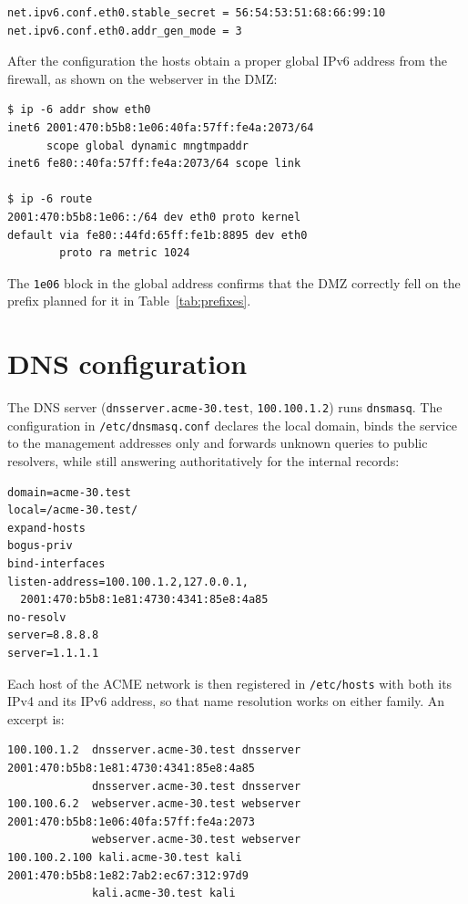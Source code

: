 \documentclass[twocolumn]{NobArticle}
\begin{document}
\begin{lstlisting}
net.ipv6.conf.eth0.stable_secret = 56:54:53:51:68:66:99:10
net.ipv6.conf.eth0.addr_gen_mode = 3
\end{lstlisting}

After the configuration the hosts obtain a proper global IPv6 address from
the firewall, as shown on the webserver in the DMZ:

\begin{lstlisting}
$ ip -6 addr show eth0
inet6 2001:470:b5b8:1e06:40fa:57ff:fe4a:2073/64
      scope global dynamic mngtmpaddr
inet6 fe80::40fa:57ff:fe4a:2073/64 scope link

$ ip -6 route
2001:470:b5b8:1e06::/64 dev eth0 proto kernel
default via fe80::44fd:65ff:fe1b:8895 dev eth0
        proto ra metric 1024
\end{lstlisting}

The \texttt{1e06} block in the global address confirms that the DMZ correctly
fell on the prefix planned for it in Table~\ref{tab:prefixes}.

\section{DNS configuration}

The DNS server (\texttt{dnsserver.acme-30.test}, \texttt{100.100.1.2}) runs
\texttt{dnsmasq}. The configuration in \texttt{/etc/dnsmasq.conf} declares the
local domain, binds the service to the management addresses only and forwards
unknown queries to public resolvers, while still answering authoritatively
for the internal records:

\newpage
\begin{lstlisting}
domain=acme-30.test
local=/acme-30.test/
expand-hosts
bogus-priv
bind-interfaces
listen-address=100.100.1.2,127.0.0.1,
  2001:470:b5b8:1e81:4730:4341:85e8:4a85
no-resolv
server=8.8.8.8
server=1.1.1.1
\end{lstlisting}

Each host of the ACME network is then registered in \texttt{/etc/hosts} with
both its IPv4 and its IPv6 address, so that name resolution works on either
family. An excerpt is:

\begin{lstlisting}
100.100.1.2  dnsserver.acme-30.test dnsserver
2001:470:b5b8:1e81:4730:4341:85e8:4a85
             dnsserver.acme-30.test dnsserver
100.100.6.2  webserver.acme-30.test webserver
2001:470:b5b8:1e06:40fa:57ff:fe4a:2073
             webserver.acme-30.test webserver
100.100.2.100 kali.acme-30.test kali
2001:470:b5b8:1e82:7ab2:ec67:312:97d9
             kali.acme-30.test kali
\end{lstlisting}
\end{document}
